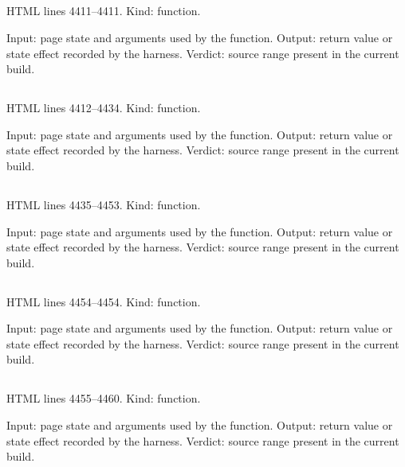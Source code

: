 \subsection*{\texttt{}}
\label{vf_174_ccCanonTarget}
HTML lines 4411--4411. Kind: function.

Input: page state and arguments used by the function.
Output: return value or state effect recorded by the harness.
Verdict: source range present in the current build.

\subsection*{\texttt{}}
\label{vf_175_sopControlIdentity}
HTML lines 4412--4434. Kind: function.

Input: page state and arguments used by the function.
Output: return value or state effect recorded by the harness.
Verdict: source range present in the current build.

\subsection*{\texttt{}}
\label{vf_176_sopLabScreening}
HTML lines 4435--4453. Kind: function.

Input: page state and arguments used by the function.
Output: return value or state effect recorded by the harness.
Verdict: source range present in the current build.

\subsection*{\texttt{}}
\label{vf_177_ccBaselineNeed}
HTML lines 4454--4454. Kind: function.

Input: page state and arguments used by the function.
Output: return value or state effect recorded by the harness.
Verdict: source range present in the current build.

\subsection*{\texttt{}}
\label{vf_178_ccNoDataReason}
HTML lines 4455--4460. Kind: function.

Input: page state and arguments used by the function.
Output: return value or state effect recorded by the harness.
Verdict: source range present in the current build.

